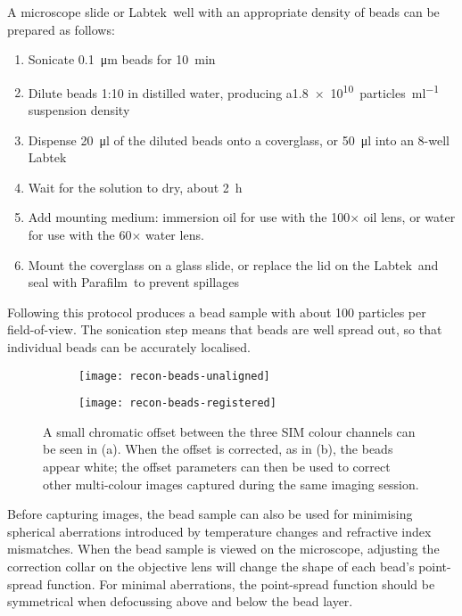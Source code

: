 A microscope slide or Labtek\texttrademark\ well with an appropriate density of beads can be prepared as follows: 
\begin{enumerate}
	\item Sonicate \SI{0.1}{\micro\metre} beads for \SI{10}{\minute}
	\item Dilute beads 1:10 in distilled water, producing a\SI{1.8e10}{particles\per\milli\litre} suspension density
	\item Dispense \SI{20}{\micro\litre} of the diluted beads onto a coverglass, or \SI{50}{\micro\litre} into an 8-well Labtek
	\item Wait for the solution to dry, about \SI{2}{\hour}
	\item Add mounting medium: immersion oil for use with the 100$\times$ oil lens, or water for use with the 60$\times$ water lens. 
	\item Mount the coverglass on a glass slide, or replace the lid on the Labtek\texttrademark\ and seal with Parafilm\texttrademark\  to prevent spillages
\end{enumerate}

Following this protocol produces a bead sample with about 100 particles per field-of-view. 
The sonication step means that beads are well spread out, so that individual beads can be accurately localised. 

\begin{figure}[p]
\centering
\begin{subfigure}[b]{0.49\textwidth}
	\texttt{[image: recon-beads-unaligned]}
	\caption{}\label{fig:recon-beads-unaligned}
\end{subfigure}
\hfill
\begin{subfigure}[b]{0.49\textwidth}
	\texttt{[image: recon-beads-registered]}
	\caption{}\label{fig:recon-beads-registered}
\end{subfigure}
\caption[LAG SIM: Multicolour alignment beads are used for correcting chromatic offset]{A small chromatic offset between the three SIM colour channels can be seen in (a). When the offset is corrected, as in (b), the beads appear white; the offset parameters can then be used to correct other multi-colour images captured during the same imaging session.  } 
\label{fig:recon-beads}
\end{figure}
\afterpage{\clearpage}

Before capturing images, the bead sample can also be used for minimising spherical aberrations introduced by temperature changes and refractive index mismatches. 
When the bead sample is viewed on the microscope, adjusting the correction collar on the objective lens will change the shape of each bead's point-spread function. 
For minimal aberrations, the point-spread function should be symmetrical when defocussing above and below the bead layer. 

